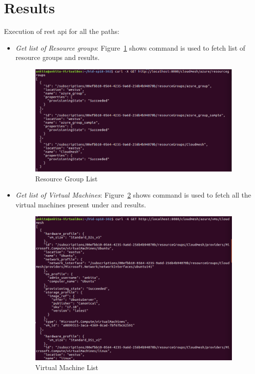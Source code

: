 \section{Results}

Execution of rest api for all the paths:

\begin{itemize}
\item \textit{Get list of Resource groups}: Figure~\ref{fig:resource-list}
shows command is used to fetch list of resource groups and results.

\begin{figure}[!ht]
        \centering\includegraphics[width=\columnwidth]
        {image/resource-list.PNG}
        \caption{Resource Group List}\label{fig:resource-list}
\end{figure}

\item \textit{Get list of Virtual Machines}: Figure~\ref{fig:vm-list} shows
command is used to fetch all the virtual machines present under and results.

\begin{figure}[!ht]
        \centering\includegraphics[width=\columnwidth]
        {image/vm-list.PNG}
        \caption{Virtual Machine List}\label{fig:vm-list}
\end{figure}


\end{itemize}
